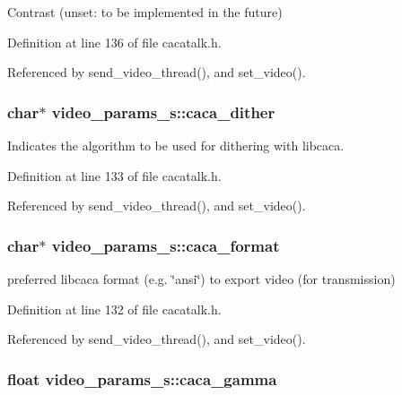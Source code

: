 \-Contrast (unset\-: to be implemented in the future) 



\-Definition at line 136 of file cacatalk.\-h.



\-Referenced by send\-\_\-video\-\_\-thread(), and set\-\_\-video().

\hypertarget{structvideo__params__s_ac064547d5eda8f8516a88922ca28ae5c}{
\subsubsection[{caca\-\_\-dither}]{\setlength{\rightskip}{0pt plus 5cm}char$\ast$ {\bf video\-\_\-params\-\_\-s\-::caca\-\_\-dither}}}\label{structvideo__params__s_ac064547d5eda8f8516a88922ca28ae5c}


\-Indicates the algorithm to be used for dithering with libcaca. 



\-Definition at line 133 of file cacatalk.\-h.



\-Referenced by send\-\_\-video\-\_\-thread(), and set\-\_\-video().

\hypertarget{structvideo__params__s_ab7b86e346f34ccf37397dfd3e6a21128}{
\subsubsection[{caca\-\_\-format}]{\setlength{\rightskip}{0pt plus 5cm}char$\ast$ {\bf video\-\_\-params\-\_\-s\-::caca\-\_\-format}}}\label{structvideo__params__s_ab7b86e346f34ccf37397dfd3e6a21128}


preferred libcaca format (e.\-g. \char`\"{}ansi\char`\"{}) to export video (for transmission) 



\-Definition at line 132 of file cacatalk.\-h.



\-Referenced by send\-\_\-video\-\_\-thread(), and set\-\_\-video().

\hypertarget{structvideo__params__s_a041f29eefbb3860f3b56eb94d96a8f94}{
\subsubsection[{caca\-\_\-gamma}]{\setlength{\rightskip}{0pt plus 5cm}float {\bf video\-\_\-params\-\_\-s\-::caca\-\_\-gamma}}}\label{structvideo__params__s_a041f29eefbb3860f3b56eb94d96a8f94}


